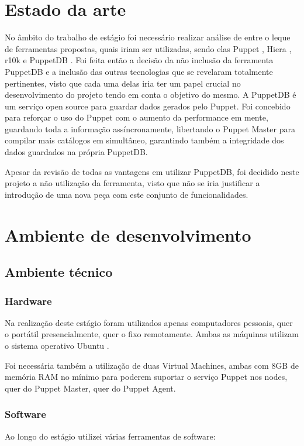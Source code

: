 \documentclass{article}
\begin{document}
\cleardoublepage
\section{Estado da arte}
No âmbito do trabalho de estágio foi necessário realizar análise de entre o leque de ferramentas propostas, quais iriam ser utilizadas, sendo elas Puppet \cite{puppet}, Hiera \cite{hiera}, r10k \cite{r10k} e PuppetDB \cite{puppetdb}. Foi feita então a decisão da não inclusão da ferramenta PuppetDB \cite{puppetdb} e a inclusão das outras tecnologias que se revelaram totalmente pertinentes, visto que cada uma delas iria ter um papel crucial no desenvolvimento do projeto tendo em conta o objetivo do mesmo. A PuppetDB é um serviço open source \cite{opensource} para guardar dados gerados pelo Puppet. Foi concebido para reforçar o uso do Puppet com o aumento da performance em mente, guardando toda a informação assíncronamente, libertando o Puppet Master \cite{puppet-master} para compilar mais catálogos em simultâneo, garantindo também a integridade dos dados guardados na própria PuppetDB.

Apesar da revisão de todas as vantagens em utilizar PuppetDB, foi decidido neste projeto a não utilização da ferramenta, visto que não se iria justificar a introdução de uma nova peça com este conjunto de funcionalidades.
\cleardoublepage
\section{Ambiente de desenvolvimento}

\subsection{Ambiente técnico}
\subsubsection{Hardware}

Na realização deste estágio foram utilizados apenas computadores pessoais, quer o portátil presencialmente, quer o fixo remotamente. Ambas as máquinas utilizam o sistema operativo Ubuntu \cite{ubuntu}.

Foi necessária também a utilização de duas Virtual Machines, ambas com 8GB de memória RAM no mínimo para poderem suportar o serviço Puppet\cite{puppet} nos nodes, quer do Puppet Master\cite{puppet-master}, quer do Puppet Agent\cite{puppet-agent}.


\subsubsection{Software}
Ao longo do estágio utilizei várias ferramentas de software:
\end{document}
